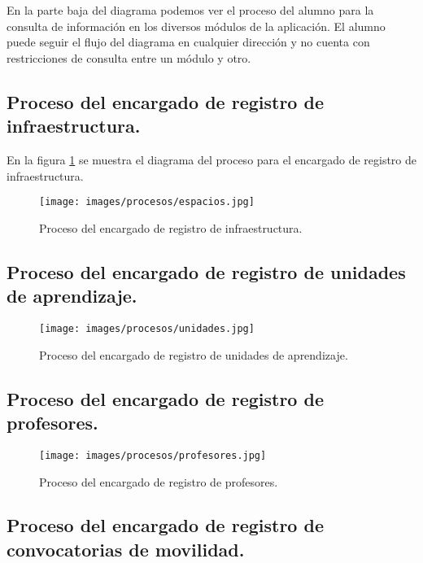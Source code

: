 En la parte baja del diagrama podemos ver el proceso del alumno para la consulta de información en los diversos módulos de la aplicación. El alumno puede seguir el flujo del diagrama en cualquier dirección y no cuenta con restricciones de consulta entre un módulo y otro.

\subsection{Proceso del encargado de registro de infraestructura.}

En la figura \ref{fig:espacios} se muestra el diagrama del proceso para el encargado de registro de infraestructura. 

\begin{figure}[h!]
	\begin{center}
		\texttt{[image: images/procesos/espacios.jpg]}
		\caption{Proceso del encargado de registro de infraestructura.}
		\label{fig:espacios}
	\end{center}
\end{figure}

\subsection{Proceso del encargado de registro de unidades de aprendizaje.}

\begin{figure}[h!]
	\begin{center}
		\texttt{[image: images/procesos/unidades.jpg]}
		\caption{Proceso del encargado de registro de unidades de aprendizaje.}
		\label{fig:unidades}
	\end{center}
\end{figure}

\subsection{Proceso del encargado de registro de profesores.}

\begin{figure}[h!]
	\begin{center}
		\texttt{[image: images/procesos/profesores.jpg]}
		\caption{Proceso del encargado de registro de profesores.}
		\label{fig:profesores}
	\end{center}
\end{figure}

\subsection{Proceso del encargado de registro de convocatorias de movilidad.}

